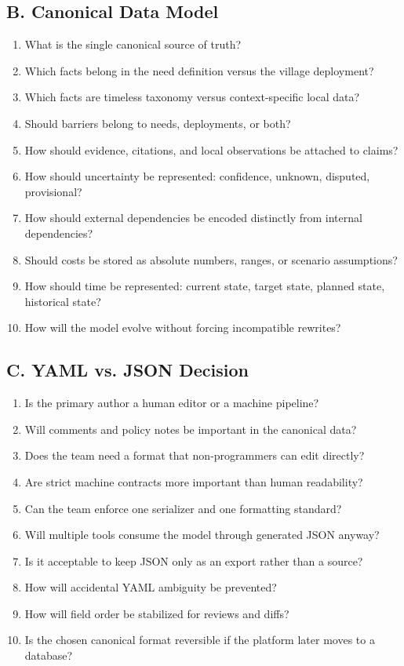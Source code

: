 \documentclass[11pt,a4paper]{article}
\begin{document}
\subsection{B. Canonical Data Model}
\begin{enumerate}
    \item What is the single canonical source of truth?
    \item Which facts belong in the need definition versus the village deployment?
    \item Which facts are timeless taxonomy versus context-specific local data?
    \item Should barriers belong to needs, deployments, or both?
    \item How should evidence, citations, and local observations be attached to claims?
    \item How should uncertainty be represented: confidence, unknown, disputed, provisional?
    \item How should external dependencies be encoded distinctly from internal dependencies?
    \item Should costs be stored as absolute numbers, ranges, or scenario assumptions?
    \item How should time be represented: current state, target state, planned state, historical state?
    \item How will the model evolve without forcing incompatible rewrites?
\end{enumerate}

\subsection{C. YAML vs. JSON Decision}
\begin{enumerate}
    \item Is the primary author a human editor or a machine pipeline?
    \item Will comments and policy notes be important in the canonical data?
    \item Does the team need a format that non-programmers can edit directly?
    \item Are strict machine contracts more important than human readability?
    \item Can the team enforce one serializer and one formatting standard?
    \item Will multiple tools consume the model through generated JSON anyway?
    \item Is it acceptable to keep JSON only as an export rather than a source?
    \item How will accidental YAML ambiguity be prevented?
    \item How will field order be stabilized for reviews and diffs?
    \item Is the chosen canonical format reversible if the platform later moves to a database?
\end{enumerate}
\end{document}
